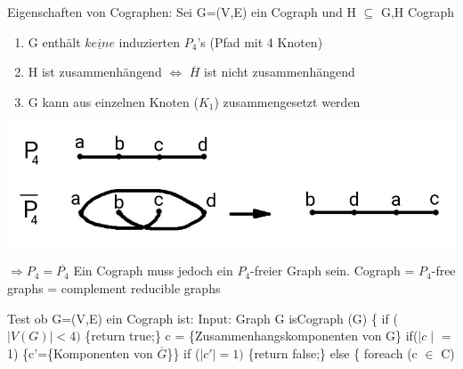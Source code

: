 Eigenschaften von Cographen:
\newline
Sei G=(V,E) ein Cograph und H $\subseteq$ G,H Cograph
\renewcommand{\labelenumi}{\roman{enumi})}
\begin{enumerate}
	\item G enthält $\underline{keine}$ induzierten $P_4$'s (Pfad mit 4 Knoten)
	\item H ist zusammenhängend $\Leftrightarrow$ $\overline{H}$ ist nicht zusammenhängend
	\item G kann aus einzelnen Knoten ($K_1$) zusammengesetzt werden
\end{enumerate}
\begin{center}
	\includegraphics[scale=0.5]{lectures/161202/pix/07.jpg}
\end{center}
$\Rightarrow P_4 = \overline{P_4}$
\newline
Ein Cograph muss jedoch ein $P_4$-freier Graph sein.
\newline
Cograph = $P_4$-free graphs = complement reducible graphs
\par\medskip
Test ob G=(V,E) ein Cograph ist:
\newline
Input: Graph G
\newline
isCograph (G) \{
\newline
\phantom{}\hspace{1.5cm} if ($\mid V(G)\mid < 4)$ \{return true;\}
\newline
\phantom{}\hspace{1.5cm} c = \{Zusammenhangskomponenten von G\}
\newline
\phantom{}\hspace{1.5cm} if($\mid c \mid $ = 1) \{c'=\{Komponenten von $\overline{G}$\}\}
\newline
\phantom{}\hspace{1.5cm} if ($\mid c'\mid = 1)$ \{return false;\}
\newline
\phantom{}\hspace{1.5cm} else \{
\newline
\phantom{}\hspace{2.5cm} foreach (c $\in$ C)
\newline
